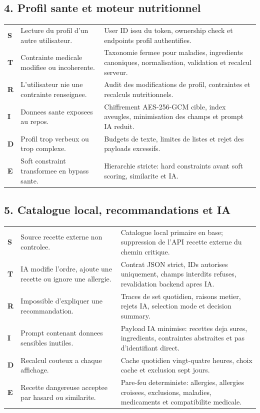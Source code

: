 \documentclass[10pt,a4paper]{article}
\begin{document}
\subsection{4. Profil sante et moteur nutritionnel}
\begin{tabularx}{\textwidth}{@{}L{1.6cm}L{4.2cm}Y@{}}
\toprule
\textbf{S} & Lecture du profil d'un autre utilisateur. & User ID issu du token, ownership check et endpoints profil authentifies. \\
\textbf{T} & Contrainte medicale modifiee ou incoherente. & Taxonomie fermee pour maladies, ingredients canoniques, normalisation, validation et recalcul serveur. \\
\textbf{R} & L'utilisateur nie une contrainte renseignee. & Audit des modifications de profil, contraintes et recalculs nutritionnels. \\
\textbf{I} & Donnees sante exposees au repos. & Chiffrement AES-256-GCM cible, index aveugles, minimisation des champs et prompt IA reduit. \\
\textbf{D} & Profil trop verbeux ou trop complexe. & Budgets de texte, limites de listes et rejet des payloads excessifs. \\
\textbf{E} & Soft constraint transformee en bypass sante. & Hierarchie stricte: hard constraints avant soft scoring, similarite et IA. \\
\bottomrule
\end{tabularx}

\subsection{5. Catalogue local, recommandations et IA}
\begin{tabularx}{\textwidth}{@{}L{1.6cm}L{4.2cm}Y@{}}
\toprule
\textbf{S} & Source recette externe non controlee. & Catalogue local primaire en base; suppression de l'API recette externe du chemin critique. \\
\textbf{T} & IA modifie l'ordre, ajoute une recette ou ignore une allergie. & Contrat JSON strict, IDs autorises uniquement, champs interdits refuses, revalidation backend apres IA. \\
\textbf{R} & Impossible d'expliquer une recommandation. & Traces de set quotidien, raisons metier, rejets IA, selection mode et decision summary. \\
\textbf{I} & Prompt contenant donnees sensibles inutiles. & Payload IA minimise: recettes deja sures, ingredients, contraintes abstraites et pas d'identifiant direct. \\
\textbf{D} & Recalcul couteux a chaque affichage. & Cache quotidien vingt-quatre heures, choix cache et exclusion sept jours. \\
\textbf{E} & Recette dangereuse acceptee par hasard ou similarite. & Pare-feu deterministe: allergies, allergies croisees, exclusions, maladies, medicaments et compatibilite medicale. \\
\bottomrule
\end{tabularx}
\end{document}
